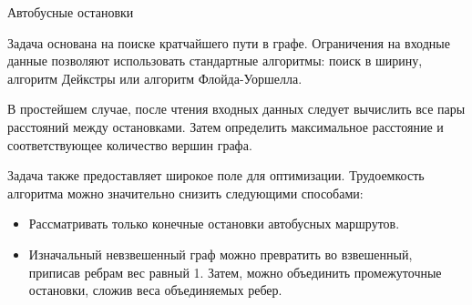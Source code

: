 \begin{tutorial}{Автобусные остановки}

Задача основана на поиске кратчайшего пути в графе. Ограничения на входные данные позволяют использовать стандартные алгоритмы: поиск в ширину, алгоритм Дейкстры или алгоритм Флойда-Уоршелла.

В простейшем случае, после чтения входных данных следует вычислить все пары расстояний между остановками. Затем определить максимальное расстояние и соответствующее количество вершин графа.

Задача также предоставляет широкое поле для оптимизации. Трудоемкость алгоритма можно значительно снизить следующими способами:
\begin{itemize}
\item Рассматривать только конечные остановки автобусных маршрутов.
\item Изначальный невзвешенный граф можно превратить во взвешенный, приписав ребрам вес равный 1. Затем, можно объединить промежуточные остановки, сложив веса объединяемых ребер.
\end{itemize}

\end{tutorial}

